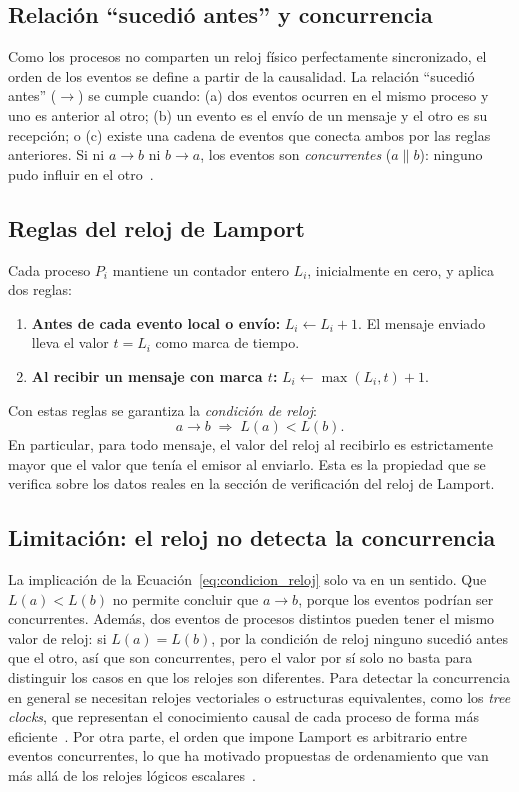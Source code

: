 \documentclass[12pt,a4paper]{article}
\begin{document}
\subsection{Relación ``sucedió antes'' y concurrencia}

Como los procesos no comparten un reloj físico perfectamente sincronizado, el orden de los eventos se define a partir de la causalidad. La relación ``sucedió antes'' ($\rightarrow$) se cumple cuando: (a) dos eventos ocurren en el mismo proceso y uno es anterior al otro; (b) un evento es el envío de un mensaje y el otro es su recepción; o (c) existe una cadena de eventos que conecta ambos por las reglas anteriores. Si ni $a \rightarrow b$ ni $b \rightarrow a$, los eventos son \emph{concurrentes} ($a \parallel b$): ninguno pudo influir en el otro~\cite{castello2024inductive}.

\subsection{Reglas del reloj de Lamport}
Cada proceso $P_i$ mantiene un contador entero $L_i$, inicialmente en cero, y aplica dos reglas:
\begin{enumerate}
  \item \textbf{Antes de cada evento local o envío:} $L_i \leftarrow L_i + 1$. El mensaje enviado lleva el valor $t = L_i$ como marca de tiempo.
  \item \textbf{Al recibir un mensaje con marca $t$:} $L_i \leftarrow \max(L_i, t) + 1$.
\end{enumerate}
Con estas reglas se garantiza la \emph{condición de reloj}:
\begin{equation}
  a \rightarrow b \;\Rightarrow\; L(a) < L(b).
  \label{eq:condicion_reloj}
\end{equation}
En particular, para todo mensaje, el valor del reloj al recibirlo es estrictamente mayor que el valor que tenía el emisor al enviarlo. Esta es la propiedad que se verifica sobre los datos reales en la sección de verificación del reloj de Lamport.

\subsection{Limitación: el reloj no detecta la concurrencia}

La implicación de la Ecuación~\eqref{eq:condicion_reloj} solo va en un sentido. Que $L(a) < L(b)$ no permite concluir que $a \rightarrow b$, porque los eventos podrían ser concurrentes. Además, dos eventos de procesos distintos pueden tener el mismo valor de reloj: si $L(a) = L(b)$, por la condición de reloj ninguno sucedió antes que el otro, así que son concurrentes, pero el valor por sí solo no basta para distinguir los casos en que los relojes son diferentes. Para detectar la concurrencia en general se necesitan relojes vectoriales o estructuras equivalentes, como los \emph{tree clocks}, que representan el conocimiento causal de cada proceso de forma más eficiente~\cite{mathur2022treeclock}. Por otra parte, el orden que impone Lamport es arbitrario entre eventos concurrentes, lo que ha motivado propuestas de ordenamiento que van más allá de los relojes lógicos escalares~\cite{haseeb2025beyond}.
\end{document}

